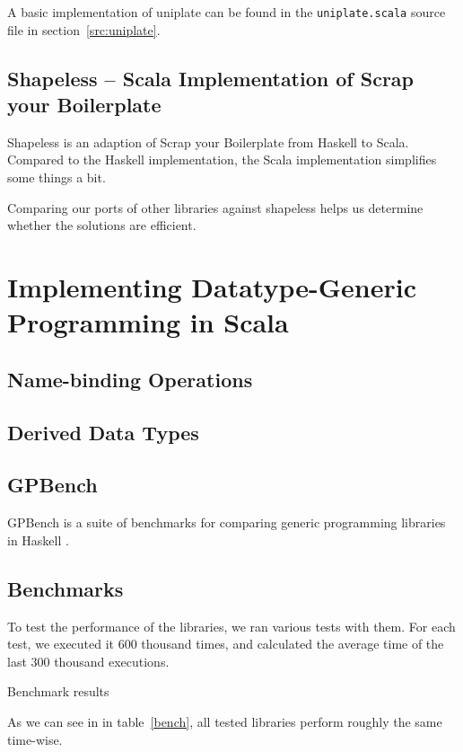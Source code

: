 \documentclass[abstracton,parskip=half]{scrreprt}
\newcommand{\cd}{\texttt}
\begin{document}
    A basic implementation of uniplate can be found in the \cd{uniplate.scala}
    source file in section~\ref{src:uniplate}.


    \section{Shapeless -- Scala Implementation of Scrap your Boilerplate}

    Shapeless is an adaption of Scrap your Boilerplate\cite{DBLP:conf/tldi/LammelJ03}
    from Haskell to Scala. Compared to the Haskell implementation, the Scala
    implementation simplifies some things a bit.

    Comparing our ports of other libraries against shapeless helps us determine
    whether the solutions are efficient.


    \chapter{Implementing Datatype-Generic Programming in Scala}
    \section{Name-binding Operations}
    \section{Derived Data Types}
    \section{GPBench}
    GPBench is a suite of benchmarks for comparing generic programming
    libraries in Haskell \cite{DBLP:conf/haskell/RodriguezJJGKO08}.

    \section{Benchmarks}

    To test the performance of the libraries, we ran various tests with them. For
    each test, we executed it 600 thousand times, and calculated the average
    time of the last 300 thousand executions.

    \begin{table}[ht]
    
    \caption{Benchmark results}
    \label{bench}
    \end{table}

    As we can see in in table~\ref{bench}, all tested libraries perform roughly
    the same time-wise.
\end{document}
